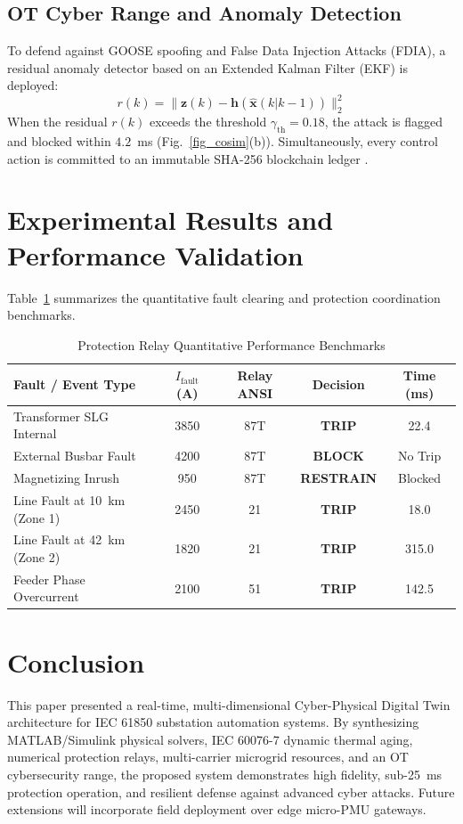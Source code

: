 \documentclass[journal]{IEEEtran}
\begin{document}
\subsection{OT Cyber Range and Anomaly Detection}
To defend against GOOSE spoofing and False Data Injection Attacks (FDIA), a residual anomaly detector based on an Extended Kalman Filter (EKF) is deployed:
\begin{equation}
r(k) = \| \mathbf{z}(k) - \mathbf{h}(\hat{\mathbf{x}}(k|k-1)) \|_2^2
\end{equation}
When the residual $r(k)$ exceeds the threshold $\gamma_{\text{th}} = 0.18$, the attack is flagged and blocked within $4.2$~ms (Fig.~\ref{fig_cosim}(b)). Simultaneously, every control action is committed to an immutable SHA-256 blockchain ledger \cite{nerc_cip}.

\section{Experimental Results and Performance Validation}
Table~\ref{tab_faults} summarizes the quantitative fault clearing and protection coordination benchmarks.

\begin{table}[!h]
\centering
\caption{Protection Relay Quantitative Performance Benchmarks}
\label{tab_faults}
\begin{tabular}{lcccc}
\toprule
\textbf{Fault / Event Type} & \textbf{$I_{\text{fault}}$ (A)} & \textbf{Relay ANSI} & \textbf{Decision} & \textbf{Time (ms)} \\
\midrule
Transformer SLG Internal & 3850 & 87T & \textbf{TRIP} & 22.4 \\
External Busbar Fault & 4200 & 87T & \textbf{BLOCK} & No Trip \\
Magnetizing Inrush & 950 & 87T & \textbf{RESTRAIN} & Blocked \\
Line Fault at 10~km (Zone 1) & 2450 & 21 & \textbf{TRIP} & 18.0 \\
Line Fault at 42~km (Zone 2) & 1820 & 21 & \textbf{TRIP} & 315.0 \\
Feeder Phase Overcurrent & 2100 & 51 & \textbf{TRIP} & 142.5 \\
\bottomrule
\end{tabular}
\end{table}

\section{Conclusion}
This paper presented a real-time, multi-dimensional Cyber-Physical Digital Twin architecture for IEC 61850 substation automation systems. By synthesizing MATLAB/Simulink physical solvers, IEC 60076-7 dynamic thermal aging, numerical protection relays, multi-carrier microgrid resources, and an OT cybersecurity range, the proposed system demonstrates high fidelity, sub-25~ms protection operation, and resilient defense against advanced cyber attacks. Future extensions will incorporate field deployment over edge micro-PMU gateways.



\end{document}
